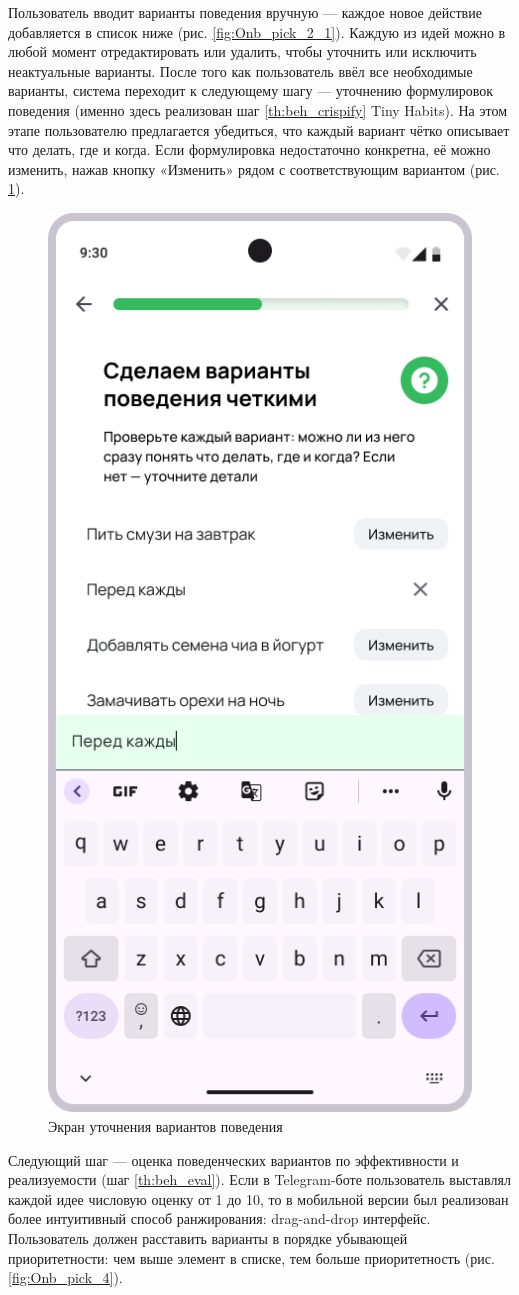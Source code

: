 \documentclass[pdflatex,sn-mathphys-num]{sn-jnl}%
\theoremstyle{thmstyleone}%
\theoremstyle{thmstyletwo}%
\theoremstyle{thmstylethree}%
\begin{document}
Пользователь вводит варианты поведения вручную — каждое новое действие добавляется в список ниже (рис. \ref{fig:Onb_pick_2_1}). Каждую из идей можно в любой момент отредактировать или удалить, чтобы уточнить или исключить неактуальные варианты. После того как пользователь ввёл все необходимые варианты, система переходит к следующему шагу — уточнению формулировок поведения (именно здесь реализован шаг \ref{th:beh_crispify} Tiny Habits). На этом этапе пользователю предлагается убедиться, что каждый вариант чётко описывает что делать, где и когда. Если формулировка недостаточно конкретна, её можно изменить, нажав кнопку «Изменить» рядом с соответствующим вариантом (рис. \ref{fig:Onb_pick_3}).

\begin{figure}
    \centering
    \includegraphics[width=0.5\linewidth]{figures/App/Onb_pick_3.png}
    \caption{Экран уточнения вариантов поведения}
    \label{fig:Onb_pick_3}
\end{figure}

Следующий шаг — оценка поведенческих вариантов по эффективности и реализуемости (шаг \ref{th:beh_eval}). Если в Telegram-боте пользователь выставлял каждой идее числовую оценку от 1 до 10, то в мобильной версии был реализован более интуитивный способ ранжирования: drag-and-drop интерфейс. Пользователь должен расставить варианты в порядке убывающей приоритетности: чем выше элемент в списке, тем больше приоритетность (рис. \ref{fig:Onb_pick_4}).
\end{document}
